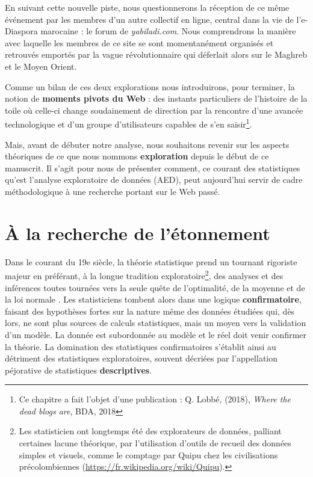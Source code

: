 \documentclass[symmetric,justified,marginals=raggedouter]{tufte-book}
\begin{document}
En suivant cette nouvelle piste, nous questionnerons la réception de ce même événement par les membres d'un autre collectif en ligne, central dans la vie de l'e-Diaspora marocaine : le forum de \textit{yabiladi.com}. Nous comprendrons la manière avec laquelle les membres de ce site se sont momentanément organisés et retrouvés emportés par la vague révolutionnaire qui déferlait alors sur le Maghreb et le Moyen Orient. 

Comme un bilan de ces deux explorations nous introduirons, pour terminer, la notion de \textbf{moments pivots du Web} : des instants particuliers de l'histoire de la toile où celle-ci change soudainement de direction par la rencontre d'une avancée technologique et d'un groupe d'utilisateurs capables de s'en saisir\footnote{\RaggedOuter Ce chapitre a fait l'objet d'une publication : Q. Lobbé, (2018), \textit{Where the dead blogs are}, BDA, 2018}.

Mais, avant de débuter notre analyse, nous souhaitons revenir sur les aspects théoriques de ce que nous nommons \textbf{exploration} depuis le début de ce manuscrit. Il s'agit pour nous de présenter comment, ce courant des statistiques qu'est l'analyse exploratoire de données (AED), peut aujourd'hui servir de cadre méthodologique à une recherche portant sur le Web passé.\\

\section{À la recherche de l'étonnement}
\label{sec:6_eda}

\noindent Dans le courant du 19e siècle, la théorie statistique prend un tournant rigoriste majeur en préférant, à la longue tradition exploratoire\footnote{\RaggedOuter Les statisticien ont longtemps été des explorateurs de données, palliant certaines lacune théorique, par l'utilisation d'outils de recueil des données simples et visuels, comme le comptage par Quipu chez les civilisations précolombiennes (\url{https://fr.wikipedia.org/wiki/Quipu}).}, des analyses et des inférences toutes tournées vers la seule quête de l'optimalité, de la moyenne et de la loi normale \citep{ladiray_laed_1997}. Les statisticiens tombent alors dans une logique \textbf{confirmatoire}, faisant des hypothèses fortes sur la nature même des données étudiées qui, dès lors, ne sont plus sources de calculs statistiques, mais un moyen vers la validation d'un modèle. La donnée est subordonnée au modèle et le réel doit venir confirmer la théorie. La domination des statistiques confirmatoires s'établit ainsi au détriment des statistiques exploratoires, souvent décriées par l'appellation péjorative de statistiques \textbf{descriptives}.
\end{document}
